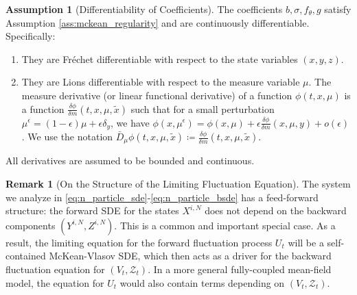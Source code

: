 \documentclass[qian]{imsart}
\theoremstyle{plain}
\theoremstyle{definition}
\newtheorem{assumption}[theorem]{Assumption}
\newtheorem{remark}[theorem]{Remark}
\begin{document}
\begin{assumption}[Differentiability of Coefficients]\label{ass:mckean_diff}
The coefficients $b, \sigma, f_\theta, g$ satisfy Assumption \ref{ass:mckean_regularity} and are continuously differentiable. Specifically:
\begin{enumerate}[label=(\roman*)]
\item They are Fréchet differentiable with respect to the state variables $(x,y,z)$.
\item They are Lions differentiable with respect to the measure variable $\mu$. The measure derivative (or linear functional derivative) of a function $\phi(t, x,\mu)$ is a function $\frac{\delta \phi}{\delta m}(t, x,\mu, \tilde{x})$ such that for a small perturbation $\mu^\epsilon = (1-\epsilon)\mu + \epsilon \delta_y$, we have $\phi(x, \mu^\epsilon) = \phi(x,\mu) + \epsilon \frac{\delta \phi}{\delta m}(x,\mu,y) + o(\epsilon)$. We use the notation $\bar{D}_\mu \phi(t, x,\mu, \tilde{x}) \coloneqq \frac{\delta \phi}{\delta m}(t, x,\mu,\tilde{x})$.
\end{enumerate}
All derivatives are assumed to be bounded and continuous.
\end{assumption}

\begin{remark}[On the Structure of the Limiting Fluctuation Equation]
The system we analyze in \eqref{eq:n_particle_sde}-\eqref{eq:n_particle_bsde} has a feed-forward structure: the forward SDE for the states $X^{i,N}$ does not depend on the backward components $(Y^{i,N}, Z^{i,N})$. This is a common and important special case. As a result, the limiting equation for the forward fluctuation process $U_t$ will be a self-contained McKean-Vlasov SDE, which then acts as a driver for the backward fluctuation equation for $(V_t, \mathcal{Z}_t)$. In a more general fully-coupled mean-field model, the equation for $U_t$ would also contain terms depending on $(V_t, \mathcal{Z}_t)$.
\end{remark}
\end{document}
